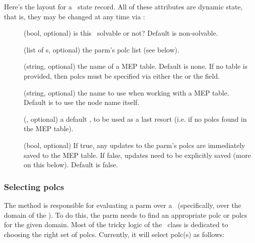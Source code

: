 \documentclass[10pt]{article}
\begin{document}
  Here's the layout for a \Parm\ state record. All of these attributes are
  dynamic state, that is, they may be changed at any time via :
  
  \begin{description}

  \item[] (bool, optional) is this \Parm\ solvable or not?
    Default is non-solvable.

  \item[] (list of \Polc{}s, optional) the parm's polc list (see below).

  \item[] (string, optional) the name of a MEP table. Default is none.
    If no table is provided, then polcs must be specified via either the
     or the  field.

  \item[] (string, optional) the name to use when working with a MEP
    table. Default is to use the node name itself.

  \item[] (\Polc, optional) a default \Polc, to be used as a last
    resort (i.e. if no polcs found in the MEP table).

  \item[] (bool, optional) If true, any updates to the parm's 
    polcs are immediately saved to the MEP table. If false, updates need to be
    explicitly saved (more on this below). Default is false.

  \end{description}
  
\subsubsection{Selecting polcs}

  The  method is responsible for evaluating a parm over a
  \Cells\ (specifically, over the domain of the \Cells). To do this, the parm
  needs to find an appropriate polc or polcs for the given domain. Most of the
  tricky logic of the \Parm\ class is dedicated to choosing the right set of
  polcs.  Currently, it will select polc(s) as follows:
\end{document}
